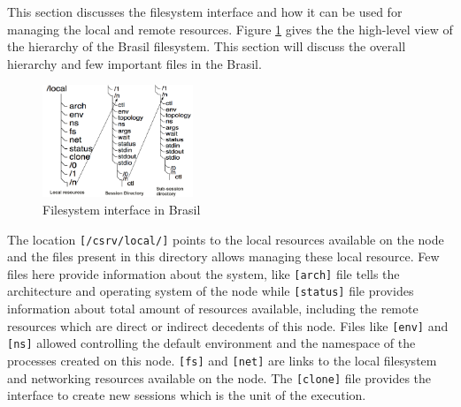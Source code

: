 \documentclass[conference]{sig-alternate}
\begin{document}
This section discusses the filesystem interface and how it can be used for
managing the local and remote resources. Figure \ref{fig:xcpu3Local} gives the
the high-level view of the hierarchy of the Brasil filesystem.  This section
will discuss the overall hierarchy and few important files in the Brasil.

\begin{figure}[h]
  \begin{center}
    \leavevmode
      \includegraphics[height=0.25\textheight,width=0.4\textwidth]
		{./img/local_session_subsessions}
    \caption{Filesystem interface in Brasil}
    \label{fig:xcpu3Local}
  \end{center}
\end{figure}

The location \texttt{[/csrv/local/]} points to the local resources available on
the node and the files present in this directory allows managing these local
resource. Few files here provide information about the system, like
\texttt{[arch]} file tells the architecture and operating system of the node
while \texttt{[status]} file provides information about total amount of
resources available, including the remote resources which are direct or
indirect decedents of this node.  Files like \texttt{[env]} and \texttt{[ns]}
allowed controlling the default environment and the namespace of the processes
created on this node.  \texttt{[fs]} and \texttt{[net]} are links to the local
filesystem and networking resources available on the node.  The
\texttt{[clone]} file provides the interface to create new sessions which is
the unit of the execution.
\end{document}
